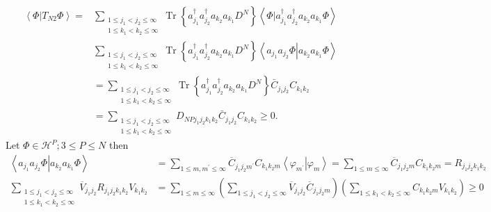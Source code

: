 \documentclass[aps,preprint]{revtex4}%
\begin{document}
\begin{align}
\left\langle \left.  \Phi\right\vert T_{N2}\Phi\right\rangle =  &
\sum_{\substack{1\leq j_{1}<j_{2}\leq\infty\\1\leq k_{1}<k_{2}\leq\infty
}}\operatorname{Tr}\left\{  a_{j_{1}}^{\dagger}a_{j_{2}}^{\dagger}a_{k_{2}%
}a_{k_{1}}D^{N}\right\}  \left\langle \left.  \Phi\right\vert a_{j_{1}%
}^{\dagger}a_{j_{2}}^{\dagger}a_{k_{2}}a_{k_{1}}\Phi\right\rangle \\
&  \sum_{\substack{1\leq j_{1}<j_{2}\leq\infty\\1\leq k_{1}<k_{2}\leq\infty
}}\operatorname{Tr}\left\{  a_{j_{1}}^{\dagger}a_{j_{2}}^{\dagger}a_{k_{2}%
}a_{k_{1}}D^{N}\right\}  \left\langle \left.  a_{j_{1}}a_{j_{2}}%
\Phi\right\vert a_{k_{2}}a_{k_{1}}\Phi\right\rangle \\
&  =\sum_{\substack{1\leq j_{1}<j_{2}\leq\infty\\1\leq k_{1}<k_{2}\leq\infty
}}\operatorname{Tr}\left\{  a_{j_{1}}^{\dagger}a_{j_{2}}^{\dagger}a_{k_{2}%
}a_{k_{1}}D^{N}\right\}  \bar{C}_{j_{1}j_{2}}C_{k_{1}k_{2}}\\
&  =\sum_{\substack{1\leq j_{1}<j_{2}\leq\infty\\1\leq k_{1}<k_{2}\leq\infty
}}D_{NPj_{1}j_{2}k_{1}k_{2}}\bar{C}_{j_{1}j_{2}}C_{k_{1}k_{2}}\geq0.
\end{align}
Let $\Phi\in\mathcal{H}^{P};3\leq P\leq N$ then%
\begin{align}
\left\langle \left.  a_{j_{1}}a_{j_{2}}\Phi\right\vert a_{k_{2}}a_{k_{1}}%
\Phi\right\rangle  &  =\sum_{1\leq m,m^{\prime}\leq\infty}\overline{C}%
_{j_{1}j_{2}m^{\prime}}C_{k_{1}k_{2}m}\left\langle \left.  \varphi_{m^{\prime
}}\right\vert \varphi_{m}\right\rangle =\sum_{1\leq m\leq\infty}\overline
{C}_{j_{1}j_{2}m}C_{k_{1}k_{2}m}=R_{j_{1}j_{2}k_{1}k_{2}}\\
\sum_{\substack{1\leq j_{1}<j_{2}\leq\infty\\1\leq k_{1}<k_{2}\leq\infty
}}\overline{V}_{j_{1}j_{2}}R_{j_{1}j_{2}k_{1}k_{2}}V_{k_{1}k_{2}}  &
=\sum_{1\leq m\leq\infty}\left(  \sum_{1\leq j_{1}<j_{2}\leq\infty}%
\overline{V}_{j_{1}j_{2}}\overline{C}_{j_{1}j_{2}m}\right)  \left(
\sum_{1\leq k_{1}<k_{2}\leq\infty}C_{k_{1}k_{2}m}V_{k_{1}k_{2}}\right)  \geq0
\end{align}%
\end{document}
